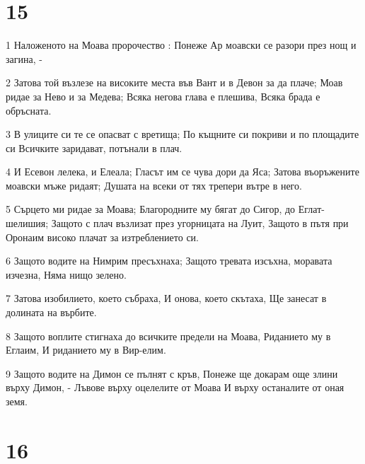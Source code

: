 \chapter{15}

\par 1 Наложеното на Моава пророчество : Понеже Ар моавски се разори през нощ и загина, -
\par 2 Затова той възлезе на високите места във Вант и в Девон за да плаче; Моав ридае за Нево и за Медева; Всяка негова глава е плешива, Всяка брада е обръсната.
\par 3 В улиците си те се опасват с вретища; По къщните си покриви и по площадите си Всичките заридават, потънали в плач.
\par 4 И Есевон лелека, и Елеала; Гласът им се чува дори да Яса; Затова въоръжените моавски мъже ридаят; Душата на всеки от тях трепери вътре в него.
\par 5 Сърцето ми ридае за Моава; Благородните му бягат до Сигор, до Еглат-шелишия; Защото с плач възлизат през угорницата на Луит, Защото в пътя при Оронаим високо плачат за изтреблението си.
\par 6 Защото водите на Нимрим пресъхнаха; Защото тревата изсъхна, моравата изчезна, Няма нищо зелено.
\par 7 Затова изобилието, което събраха, И онова, което скътаха, Ще занесат в долината на върбите.
\par 8 Защото воплите стигнаха до всичките предели на Моава, Риданието му в Еглаим, И риданието му в Вир-елим.
\par 9 Защото водите на Димон се пълнят с кръв, Понеже ще докарам още злини върху Димон, - Лъвове върху оцелелите от Моава И върху останалите от оная земя.

\chapter{16}

